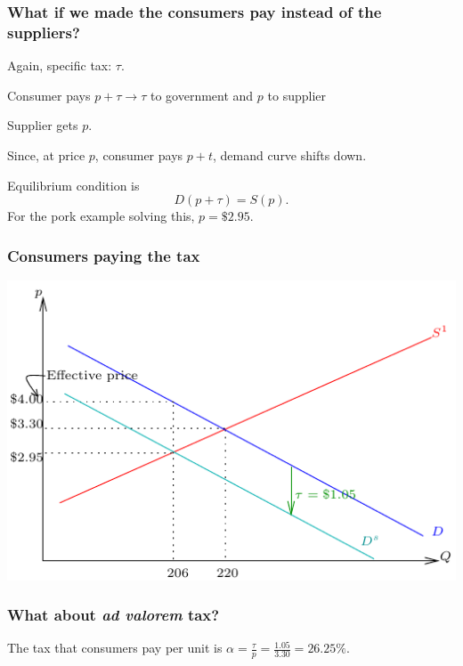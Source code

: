 \documentclass[xcolor=pdftex,dvipsnames]{beamer}
\begin{document}
\begin{frame}
\frametitle{What if we made the consumers pay instead of the
  suppliers?}
Again, specific tax: $\tau$.\bigskip

Consumer pays $p+\tau\to \tau$ to government and $p$ to supplier
\bigskip

Supplier gets $p$.\bigskip

Since, at price $p$, consumer pays $p+t$, demand curve shifts down.
\bigskip

Equilibrium condition is 
\[
D(p+\tau) = S(p).
\]
For the pork example solving this, $p=\$2.95$. \bigskip

\end{frame}
\begin{frame}
\frametitle{Consumers paying the tax}
\begin{center}
\includegraphics{pics/DemandTax1}
\end{center}
\end{frame}
\begin{frame}
\frametitle{What about \emph{ad valorem} tax?}
The tax that consumers pay per unit is $\alpha=\frac{\tau}{p} =
\frac{1.05}{3.30} =26.25\%$.
\bigskip

\bigskip


\end{frame}
\end{document}
